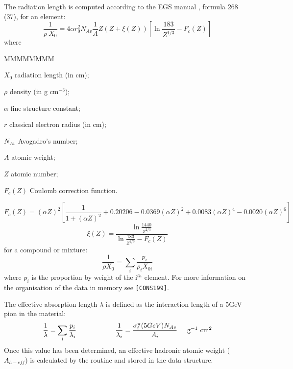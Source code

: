 The radiation length is computed according to the EGS
manual \cite{bib-EGS3}, formula 268 (37), for an element:
\[
\frac{1} {\rho \: X_0 }=4 \alpha r_{0}^2 N_{Av}  \frac{1}{A}
     Z(Z+ \xi (Z)) \left[ \ln \frac{183}{Z^{1/3}}
      -F_c (Z) \right]
\]
where
\begin{DLtt}{MMMMMMMM}
\item[$X_0$]   radiation length (in cm);
\item[$\rho$] density (in g cm$^{-3}$);
\item[$\alpha$] fine structure constant;
\item[$r$]classical electron radius (in cm);
\item[$N_{Av}$] Avogadro's number;
\item[$A$]atomic weight;
\item[$Z$]atomic number;
\item[$F_c(Z)$] Coulomb correction function.
\end{DLtt}
\[
F_c (Z) = (\alpha Z)^2 \left[ \frac{1}
     { 1+( \alpha Z)^2}  +0.20206-0.0369( \alpha Z)^2
      +0.0083(\alpha Z)^4 -0.0020(\alpha Z)^6 \right]
\]
\[
\xi (Z) = \frac{\ln \frac{1440}{Z^{2/3}}}
        {\ln \frac{183}{Z^{1/3}} - F_c (Z)}
\]
for a compound or mixture:
\[
 \frac{1}{\rho X_0}=\sum_i \frac{p_i}{\rho_i X_{0i}}
\]
where $p_i$ is the proportion by weight of the i$^{th}$ element.
For more information on the organisation of the data in memory
see {\tt [CONS199]}.

The effective absorption length $\lambda$ is defined as
the interaction length of a 5GeV pion in the material:
\[
\frac{1}{\lambda} = \sum_i \frac{p_i}{\lambda_i}
\hspace{2cm} \frac{1}{\lambda_i} = \frac{\sigma^{\pi}_{i}(5GeV)
 N_{Av}}{A_{i}} 
\hspace{0.5cm} \mbox{g$^{-1}$ cm$^{2}$}
\]
Once this value has been determined, an effective hadronic atomic weight 
($A_{h-eff}$) is calculated by the routine  \cite{bib-GHMI}
and stored in the data structure.
